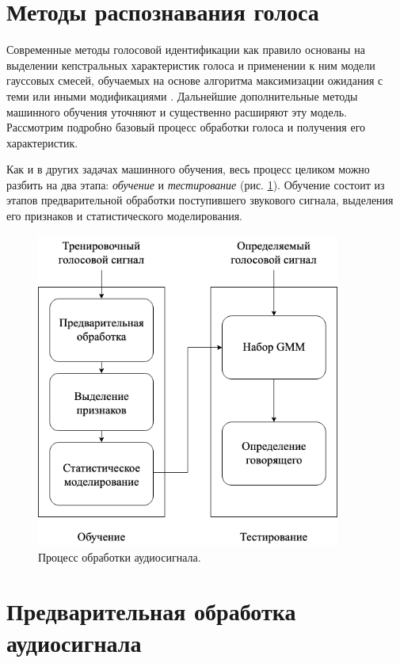 \documentclass[12pt]{gost-7-32}
\begin{document}
\newpage
\section{Методы распознавания голоса}

Современные методы голосовой идентификации как правило основаны на выделении кепстральных характеристик голоса и применении к ним модели гауссовых смесей, обучаемых на основе алгоритма максимизации ожидания с теми или иными модификациями \cite{bai2021}.
Дальнейшие дополнительные методы машинного обучения уточняют и существенно расширяют эту модель.
Рассмотрим подробно базовый процесс обработки голоса и получения его характеристик.

Как и в других задачах машинного обучения, весь процесс целиком можно разбить на два этапа: \textit{обучение} и \textit{тестирование} (рис. \ref{fig:audio_flow}).
Обучение состоит из этапов предварительной обработки поступившего звукового сигнала, выделения его признаков и статистического моделирования.

\begin{figure}[h!]
    \centering
    \includegraphics[width=10cm]{./audio_flow.png}
    \caption{Процесс обработки аудиосигнала.}
    \label{fig:audio_flow}
\end{figure}

\newpage
\section{Предварительная обработка аудиосигнала}
\end{document}
